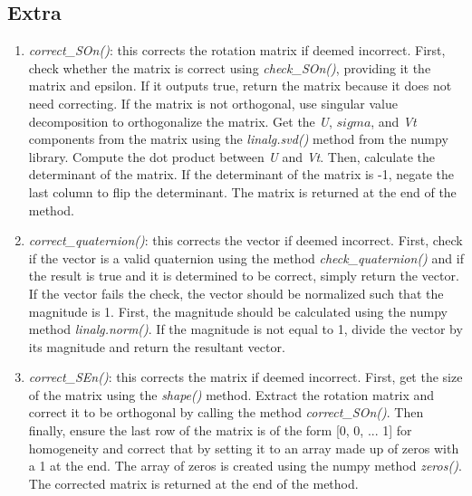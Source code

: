 \documentclass{article}
\begin{document}
\subsection{Extra}
\begin{enumerate}
    \item \textit{correct\_SOn()}: this corrects the rotation matrix if deemed incorrect. First, check whether the matrix is correct using \textit{check\_SOn()}, providing it the matrix and epsilon. If it outputs true, return the matrix because it does not need correcting. If the matrix is not orthogonal, use singular value decomposition to orthogonalize the matrix. Get the \textit{U}, \(sigma\), and \textit{Vt} components from the matrix using the \textit{linalg.svd()} method from the numpy library. Compute the dot product between \textit{U} and \textit{Vt}. Then, calculate the determinant of the matrix. If the determinant of the matrix is -1, negate the last column to flip the determinant. The matrix is returned at the end of the method.
    
    \item \textit{correct\_quaternion()}: this corrects the vector if deemed incorrect. First, check if the vector is a valid quaternion using the method \textit{check\_quaternion()} and if the result is true and it is determined to be correct, simply return the vector. If the vector fails the check, the vector should be normalized such that the magnitude is 1.  First, the magnitude should be calculated using the numpy method \textit{linalg.norm()}. If the magnitude is not equal to 1, divide the vector by its magnitude and return the resultant vector.

    \item \textit{correct\_SEn()}: this corrects the matrix if deemed incorrect. First, get the size of the matrix using the \textit{shape()} method. Extract the rotation matrix and correct it to be orthogonal by calling the method \textit{correct\_SOn()}. Then finally, ensure the last row of the matrix is of the form [0, 0, ... 1] for homogeneity and correct that by setting it to an array made up of zeros with a 1 at the end. The array of zeros is created using the numpy method \textit{zeros()}. The corrected matrix is returned at the end of the method.
\end{enumerate}
\end{document}
